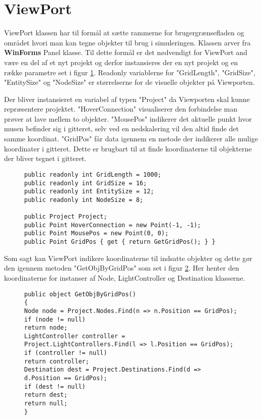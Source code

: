 \section{ViewPort}\label{ViewPort}

ViewPort klassen har til formål at sætte rammerne for brugergrænsefladen og området hvori man kan tegne objekter til brug i simuleringen. Klassen arver fra \textbf{WinForms} Panel klasse. Til dette formål er det nødvendigt for ViewPort and være en del af et nyt projekt og derfor instansieres der en nyt projekt og en række parametre set i figur \ref{ViewportParameters}. Readonly variablerne for "GridLength", "GridSize", "EntitySize" og "NodeSize" er størrelserne for de visuelle objekter på Viewporten.

\vspace{5mm}

Der bliver instansieret en variabel af typen "Project" da Viewporten skal kunne repræsentere projektet. "HoverConnection" visualiserer den forbindelse man prøver at lave mellem to objekter. "MousePos" indikerer det aktuelle punkt hvor musen befinder sig i gitteret, selv ved en nedskalering vil den altid finde det samme koordinat. "GridPos" får data igennem en metode der indikerer alle mulige koordinater i gitteret. Dette er brugbart til at finde koordinaterne til objekterne der bliver tegnet i gitteret.

\begin{figure}[H]
\begin{lstlisting}
public readonly int GridLength = 1000;
public readonly int GridSize = 16;
public readonly int EntitySize = 12;
public readonly int NodeSize = 8;

public Project Project;
public Point HoverConnection = new Point(-1, -1);
public Point MousePos = new Point(0, 0);
public Point GridPos { get { return GetGridPos(); } }
\end{lstlisting}
\caption{}
\label{ViewportParameters}
\end{figure}

Som sagt kan ViewPort indikere koordinaterne til indsatte objekter og dette gør den igennem metoden "GetObjByGridPos" som set i figur \ref{ViewportGetObjByGridPos}. Her henter den koordinaterne for instanser af Node, LightController og Destination klasserne.

\begin{figure}
\begin{lstlisting}
public object GetObjByGridPos()
{
Node node = Project.Nodes.Find(n => n.Position == GridPos);
if (node != null)
return node;
LightController controller = Project.LightControllers.Find(l => l.Position == GridPos);
if (controller != null)
return controller;
Destination dest = Project.Destinations.Find(d => d.Position == GridPos);
if (dest != null)
return dest;
return null;
}
\end{lstlisting}
\caption{}
\label{ViewportGetObjByGridPos}
\end{figure}
